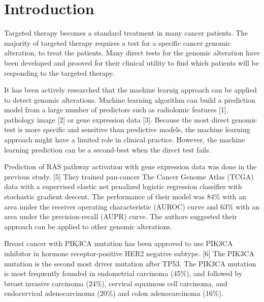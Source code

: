 \documentclass[10pt,letterpaper]{article}
\begin{document}

\linenumbers

\hypertarget{introduction}{%
\section{Introduction}\label{introduction}}

Targeted therapy becomes a standard treatment in many cancer patients.
The majority of targeted therapy requires a test for a specific cancer
genomic alteration, to treat the patients. Many direct tests for the
genomic alteration have been developed and prooved for their clinical
utility to find which patients will be responding to the targeted
therapy.

It has been actively researched that the machine learnig approach can be
applied to detect genomic alterations. Machine learning algorithm can
build a prediction model from a large number of predictors such as
radiolomic features {[}1{]}, pathology image {[}2{]} or gene expression
data {[}3{]}. Because the most direct genomic test is more specific and
sensitive than predictive models, the machine learning approach might
have a limited role in clinical practice. However, the machine learning
prediction can be a second-best when the direct test fails.

Prediction of RAS pathway activation with gene expression data was done
in the previous study. {[}5{]} They trained pan-cancer The Cancer Genome
Atlas (TCGA) data with a supervised elastic net penalized logistic
regression classifier with stochastic gradient descent. The performance
of their model was 84\% with an area under the receiver operating
characteristic (AUROC) curve and 63\% with an area under the
precision-recall (AUPR) curve. The authors suggested their approach can
be applied to other genomic alterations.

Breast cancer with PIK3CA mutation has been approved to use PIK3CA
inhibitor in hormone receptor-positive HER2 negative subtype. {[}6{]}
The PIK3CA mutation is the second most driver mutation after TP53. The
PIK3CA mutation is most frequently founded in endometrial carcinoma
(45\%), and followed by breast invasive carcinoma (24\%), cervical
squamous cell carcinoma, and endocervical adenocarcinoma (20\%) and
colon adenocarcinoma (16\%).
\end{document}
